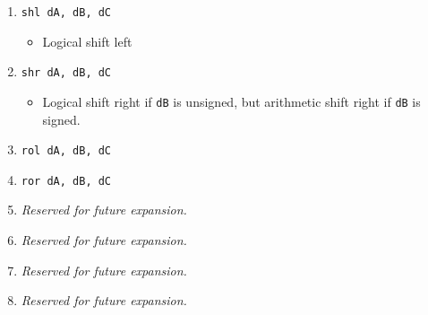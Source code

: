 \documentclass{article}
\begin{document}
\begin{itemize}
\begin{enumerate}
			\item \texttt{shl dA, dB, dC}
				\begin{itemize}
				\item Logical shift left
				\end{itemize}
			\item \texttt{shr dA, dB, dC}
				\begin{itemize}
				\item Logical shift right if \texttt{dB} is unsigned, but
					arithmetic shift right if \texttt{dB} is signed.
				\end{itemize}
			\item \texttt{rol dA, dB, dC}
			\item \texttt{ror dA, dB, dC}


			\item \textit{Reserved for future expansion.}
			\item \textit{Reserved for future expansion.}
			\item \textit{Reserved for future expansion.}
			\item \textit{Reserved for future expansion.}
			\end{enumerate}
		\end{itemize}
\end{document}
